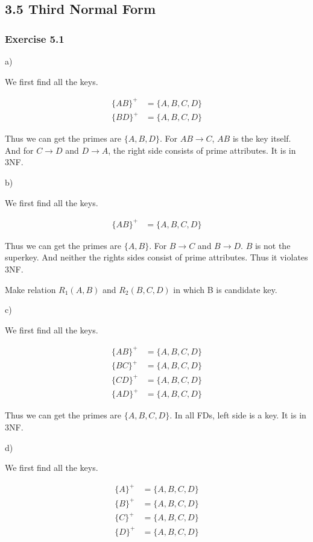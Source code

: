 \documentclass[../../main.tex]{subfiles}
\begin{document}
\subsection*{3.5 Third Normal Form}

\subsubsection*{Exercise 5.1}

a)

We first find all the keys.

\begin{align*}
  \{AB\}^{+} &= \{A,B,C,D\} \\
  \{BD\}^{+} &= \{A,B,C,D\}
\end{align*}

Thus we can get the primes are $\{A, B, D\}$. For $AB \to C$,
$AB$ is the key itself. And for $C \to D$ and $D \to A$, the
right side consists of prime attributes. It is in 3NF.

b)

We first find all the keys.

\begin{align*}
  \{AB\}^{+} &= \{A,B,C,D\}
\end{align*}

Thus we can get the primes are $\{A, B\}$. For $B \to C$
and $B \to D$. $B$ is not the superkey. And neither the rights
sides consist of prime attributes. Thus it violates 3NF.

Make relation $R_{1}(A,B)$ and $R_{2}(B,C,D)$ in which B is candidate key.

c)

We first find all the keys.

\begin{align*}
  \{AB\}^{+} &= \{A,B,C,D\} \\
  \{BC\}^{+} &= \{A,B,C,D\} \\
  \{CD\}^{+} &= \{A,B,C,D\} \\
  \{AD\}^{+} &= \{A,B,C,D\}
\end{align*}

Thus we can get the primes are $\{A, B, C, D\}$. In all FDs, left side
is a key. It is in 3NF.

d)

We first find all the keys.

\begin{align*}
  \{A\}^{+} &= \{A,B,C,D\} \\
  \{B\}^{+} &= \{A,B,C,D\} \\
  \{C\}^{+} &= \{A,B,C,D\} \\
  \{D\}^{+} &= \{A,B,C,D\}
\end{align*}
\end{document}
